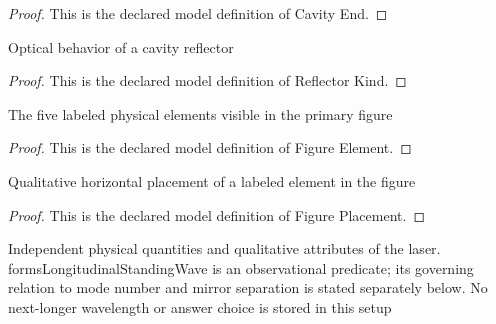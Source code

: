 \begin{proof}
  This is the declared model definition of Cavity End.
\end{proof}
\begin{definition}
  \label{def:physics:phyx-mini-0245:phyxminiproblems-problemphyxmini0245-reflectorkind}
  Optical behavior of a cavity reflector
\end{definition}
\begin{proof}
  This is the declared model definition of Reflector Kind.
\end{proof}
\begin{definition}
  \label{def:physics:phyx-mini-0245:phyxminiproblems-problemphyxmini0245-figureelement}
  The five labeled physical elements visible in the primary figure
\end{definition}
\begin{proof}
  This is the declared model definition of Figure Element.
\end{proof}
\begin{definition}
  \label{def:physics:phyx-mini-0245:phyxminiproblems-problemphyxmini0245-figureplacement}
  Qualitative horizontal placement of a labeled element in the figure
\end{definition}
\begin{proof}
  This is the declared model definition of Figure Placement.
\end{proof}
\begin{definition}
  \label{def:physics:phyx-mini-0245:phyxminiproblems-problemphyxmini0245-heliumneonlasercavitysetup}
  Independent physical quantities and qualitative attributes of the laser. formsLongitudinalStandingWave is an observational predicate; its governing relation to mode number and mirror separation is stated separately below. No next-longer wavelength or answer choice is stored in this setup
\end{definition}
